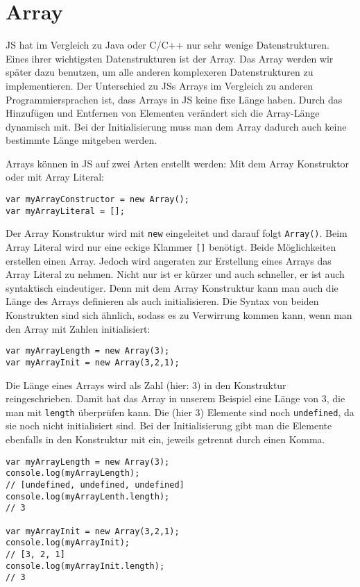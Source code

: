 \documentclass{book}
\begin{document}
\section{Array}
JS hat im Vergleich zu Java oder C/C++ nur sehr wenige Datenstrukturen. Eines ihrer wichtigsten Datenstrukturen ist der Array. Das Array werden wir später dazu benutzen, um alle anderen komplexeren Datenstrukturen zu implementieren. Der Unterschied zu JSs Arrays im Vergleich zu anderen Programmiersprachen ist, dass Arrays in JS keine fixe Länge haben. Durch das Hinzufügen und Entfernen von Elementen verändert sich die Array-Länge dynamisch mit. Bei der Initialisierung muss man dem Array dadurch auch keine bestimmte Länge mitgeben werden.

Arrays können in JS auf zwei Arten erstellt werden: Mit dem Array Konstruktor oder mit Array Literal:
\begin{lstlisting}[caption=Array Konstruktor]
var myArrayConstructor = new Array();
var myArrayLiteral = [];
\end{lstlisting}

Der Array Konstruktur wird mit \lstinline|new| eingeleitet und darauf folgt \lstinline|Array()|. Beim Array Literal wird nur eine eckige Klammer \lstinline|[]| benötigt. Beide Möglichkeiten erstellen einen Array. Jedoch wird angeraten zur Erstellung eines Arrays das Array Literal zu nehmen. Nicht nur ist er kürzer und auch schneller, er ist auch syntaktisch eindeutiger. Denn mit dem Array Konstruktur kann man auch die Länge des Arrays definieren als auch initialisieren. Die Syntax von beiden Konstrukten sind sich ähnlich, sodass es zu Verwirrung kommen kann, wenn man den Array mit Zahlen initialisiert:

\begin{lstlisting}[caption=Array Konstruktor]
var myArrayLength = new Array(3);
var myArrayInit = new Array(3,2,1);
\end{lstlisting}

Die Länge eines Arrays wird als Zahl (hier: 3) in den Konstruktur reingeschrieben. Damit hat das Array in unserem Beispiel eine Länge von 3, die man mit \lstinline|length| überprüfen kann. Die (hier 3) Elemente sind noch \lstinline|undefined|, da sie noch nicht initialisiert sind. Bei der Initialisierung gibt man die Elemente ebenfalls in den Konstruktur mit ein, jeweils getrennt durch einen Komma. 
\begin{lstlisting}[caption=Array Konstruktor]
var myArrayLength = new Array(3);
console.log(myArrayLength); 
// [undefined, undefined, undefined]
console.log(myArrayLenth.length); 
// 3

var myArrayInit = new Array(3,2,1);
console.log(myArrayInit); 
// [3, 2, 1]
console.log(myArrayInit.length); 
// 3
\end{lstlisting}
\end{document}
